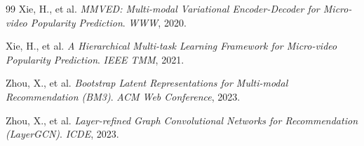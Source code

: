 \documentclass[12pt, a4paper]{article}
\begin{document}
\begin{thebibliography}{99}
Xie, H., et al.
\newblock \emph{MMVED: Multi-modal Variational Encoder-Decoder for Micro-video
  Popularity Prediction}.
\newblock \textit{WWW}, 2020.

Xie, H., et al.
\newblock \emph{A Hierarchical Multi-task Learning Framework for Micro-video
  Popularity Prediction}.
\newblock \textit{IEEE TMM}, 2021.

Zhou, X., et al.
\newblock \emph{Bootstrap Latent Representations for Multi-modal Recommendation (BM3)}.
\newblock \textit{ACM Web Conference}, 2023.

Zhou, X., et al.
\newblock \emph{Layer-refined Graph Convolutional Networks for Recommendation (LayerGCN)}.
\newblock \textit{ICDE}, 2023.

\end{thebibliography}
\end{document}
